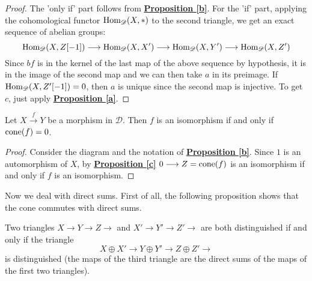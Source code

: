 \begin{proof}
The 'only if' part follows from \hyperref[b]{\textbf{Proposition \ref*{b}}}. For the 'if' part, applying the cohomological functor $\textnormal{Hom}_{\mathscr{D}}(X,*)$ to the second triangle, we get an exact sequence of abelian groups: $$\textnormal{Hom}_{\mathscr{D}}(X,Z[-1]) \longrightarrow \textnormal{Hom}_{\mathscr{D}}(X,X') \longrightarrow \textnormal{Hom}_{\mathscr{D}}(X,Y') \longrightarrow \textnormal{Hom}_{\mathscr{D}}(X,Z')$$
Since $bf$ is in the kernel of the last map of the above sequence by hypothesis, it is in the image of the second map and we can then take $a$ in its preimage. If $\textnormal{Hom}_{\mathscr{D}}(X,Z'[-1])=0$, then $a$ is unique since the second map is injective. To get $c$, just apply \hyperref[a]{\textbf{Proposition \ref*{a}}}.   
\end{proof}

\begin{prop}\label{i}
Let $X \overset{f}{\longrightarrow} Y$ be a morphism in $\mathscr{D}$. Then $f$ is an isomorphism if and only if $\textnormal{cone}(f)=0$. 
\end{prop}

\begin{proof}
Consider the diagram and the notation of \hyperref[b]{\textbf{Proposition \ref*{b}}}. Since $1$ is an automorphism of $X$, by \hyperref[c]{\textbf{Proposition \ref*{c}}} $0 \longrightarrow Z=\textnormal{cone}(f)$ is an isomorphism if and only if $f$ is an isomorphism. 
\end{proof}

Now we deal with direct sums. First of all, the following proposition shows that the cone commutes with direct sums. 

\begin{prop}\label{e}
Two triangles $X \longrightarrow Y \longrightarrow Z \longrightarrow$ and $X' \longrightarrow Y' \longrightarrow Z' \longrightarrow$ are both distinguished if and only if the triangle $$X \oplus X' \longrightarrow Y \oplus Y' \longrightarrow Z \oplus Z' \longrightarrow$$ 
is distinguished (the maps of the third triangle are the direct sums of the maps of the first two triangles).
\end{prop}

